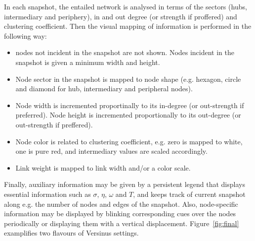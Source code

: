 \documentclass[runningheads]{llncs}
\begin{document}
In each snapshot, the entailed network is analysed in terms of the sectors (hubs, intermediary and periphery), in and out degree (or strength if proffered) and clustering coefficient. Then the visual mapping of information is performed in the following way:
\begin{itemize}
  \item nodes not incident in the snapshot are not shown. Nodes incident in the snapshot is given a minimum width and height.
  \item Node sector in the snapshot is mapped to node shape (e.g. hexagon, circle and diamond for hub, intermediary and peripheral nodes).
  \item Node width is incremented proportinally to its in-degree (or out-strength if preferred). Node height is incremented proportionally to its out-degree (or out-strength if preffered).
  \item Node color is related to clustering coefficient, e.g. zero is mapped to white, one is pure red, and intermediary values are scaled accordingly.
  \item Link weight is mapped to link width and/or a color scale.
\end{itemize}

Finally, auxiliary information may be given by a persistent legend that displays essential information such as $\sigma$, $\eta$, $\omega$ and $T$, and keeps track of current snapshot along e.g. the number of nodes and edges of the snapshot.
Also, node-specific information may be displayed by blinking corresponding cues over the nodes periodically or displaying them with a vertical displacement.
Figure~\ref{fig:final} examplifies two flavours of Versinus settings.
\end{document}
